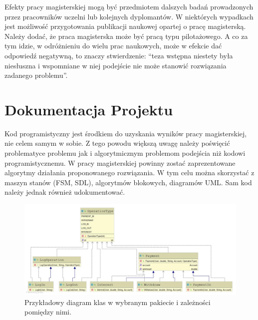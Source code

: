 \documentclass[12pt,a4paper]{article}
\begin{document}
Efekty pracy magisterskiej mogą być przedmiotem dalszych badań prowadzonych przez pracowników uczelni lub kolejnych dyplomantów. W niektórych wypadkach jest możliwość przygotowania publikacji naukowej opartej o pracę magisterską. Należy dodać, że praca magisterska może być pracą typu pilotażowego. A co za tym idzie, w odróżnieniu do wielu prac naukowych, może w efekcie dać odpowiedź negatywną, to znaczy stwierdzenie: ``teza wstępna niestety była niesłuszna i wspomniane w niej podejście nie może stanowić rozwiązania zadanego problemu''.

\section{Dokumentacja Projektu}\label{dokumentacja}

Kod programistyczny jest środkiem do uzyskania wyników pracy magisterskiej, nie celem samym w sobie. Z tego powodu większą uwagę należy poświęcić problematyce problemu jak i algorytmicznym problemom podejścia niż kodowi programistycznemu. W pracy magisterskiej powinny zostać zaprezentowane algorytmy działania proponowanego rozwiązania. W tym celu można skorzystać z maszyn stanów (FSM, SDL), algorytmów blokowych, diagramów UML. Sam kod należy jednak również udokumentować.

\begin{figure}[h]
\centering
\includegraphics[width = \textwidth]{DiagramKlasPakiet.jpg}
\caption{Przykładowy diagram klas w wybranym pakiecie i zależności pomiędzy nimi.}\label{diagram_klas_pakiet}
\end{figure}
\end{document}
